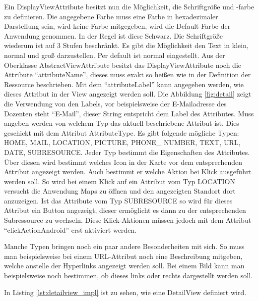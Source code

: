 Ein DisplayViewAttribute besitzt nun die Möglichkeit, die Schriftgröße und -farbe zu definieren. Die angegebene Farbe muss eine Farbe in hexadezimaler Darstellung sein, wird keine Farbe mitgegeben, wird die Default-Farbe der Anwendung genommen. In der Regel ist diese Schwarz.  Die Schriftgröße wiederum ist auf 3 Stufen beschränkt. Es gibt die Möglichkeit den Text in klein, normal und groß darzustellen. Per default ist normal eingestellt. Aus der Oberklasse AbstractViewAttribute besitzt das DisplayViewAttribute noch die Attribute \enquote{attributeName}, dieses muss exakt so heißen wie in der Definition der Ressource beschrieben.
Mit dem \enquote{attributeLabel} kann angegeben werden, wie dieses Attribut in der View angezeigt werden soll. Die Abbildung \ref{fig:detail} zeigt die Verwendung von den Labels, vor beispielsweise der E-Mailadresse des Dozenten steht \enquote{E-Mail}, dieser String entspricht dem Label des Attributes. Muss angeben werden von welchem Typ das aktuell beschriebene Attribut ist.
Dies geschickt mit dem Attribut AttributeType. Es gibt folgende mögliche Typen: HOME, MAIL, LOCATION, PICTURE, PHONE\_ NUMBER, TEXT, URL, DATE, SUBRESOURCE. Jeder Typ bestimmt die Eigenschaften des Attributes. Über diesen wird bestimmt welches Icon in der Karte vor dem entsprechenden Attribut angezeigt werden. Auch bestimmt er welche Aktion bei Klick ausgeführt werden soll. So wird bei einem Klick auf ein Attribut vom Typ LOCATION versucht die Anwendung Maps zu öffnen und den angezeigten Standort dort anzuzeigen. Ist das Attribute vom Typ SUBRESOURCE so wird für dieses Attribut ein Button angezeigt, dieser ermöglicht es dann zu der entsprechenden Subressource zu wechseln. Diese Klick-Aktionen müssen jedoch mit dem Attribut \enquote{clickActionAndroid} erst aktiviert werden.

Manche Typen bringen noch ein paar andere Besonderheiten mit sich. So muss man beispielsweise bei einem URL-Attribut noch eine Beschreibung mitgeben, welche anstelle der Hyperlinks angezeigt werden soll. Bei einem Bild kann man beispielsweise noch bestimmen, ob dieses links oder rechts dargestellt werden soll. 

In Listing \ref{lst:detailview_impl} ist zu sehen, wie eine DetailView definiert wird.

